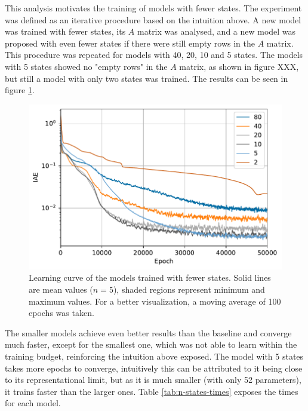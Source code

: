 This analysis motivates the training of models with fewer states.
The experiment was defined as an iterative procedure based on the intuition above.
A new model was trained with fewer states, its $A$ matrix was analysed, and a new model was proposed with even fewer states if there were still empty rows in the $A$ matrix.
This procedure was repeated for models with 40, 20, 10 and 5 states.
The models with 5 states showed no "empty rows" in the $A$ matrix, as shown in figure XXX, but still a model with only two states was trained.  %
The results can be seen in figure \ref{fig:states-iae}.

\begin{figure}[h]
    \centering
    \includegraphics{images/exp_2_iae.pdf}
    \caption{Learning curve of the models trained with fewer states. Solid lines are mean values ($n=5$), shaded regions represent minimum and maximum values. For a better visualization, a moving average of 100 epochs was taken.}
    \label{fig:states-iae}
\end{figure}

The smaller models achieve even better results than the baseline and converge much faster, except for the smallest one, which was not able to learn within the training budget, reinforcing the intuition above exposed.
The model with 5 states takes more epochs to converge, intuitively this can be attributed to it being close to its representational limit, but as it is much smaller (with only 52 parameters), it trains faster than the larger ones.
Table \ref{tab:n-states-times} exposes the times for each model.

